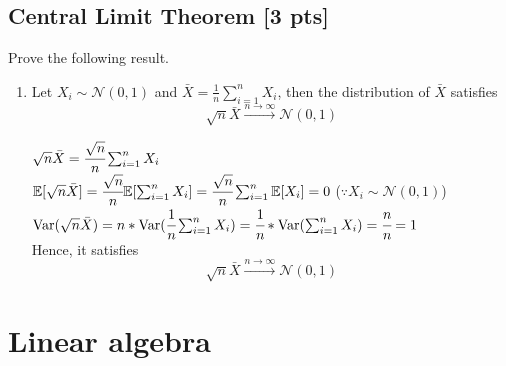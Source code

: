 \documentclass[a4paper]{article}
\theoremstyle{definition}
\newcommand{\Var}{\mathrm{Var}}
\newenvironment{soln}{
	\leavevmode\color{blue}\ignorespaces
}{}
\begin{document}
	\subsection{Central Limit Theorem [3 pts]}
	Prove the following result.
	\begin{enumerate}
		\item Let $X_i\sim\mathcal{N}(0, 1)$ and $\bar{X} = \frac{1}{n}\sum_{i=1}^n X_i$, then the distribution of $\bar{X}$ satisfies 
		$$\sqrt{n}\bar{X}\overset{n\rightarrow\infty}{\longrightarrow}\mathcal{N}(0, 1)$$
		
		\begin{soln} $ \sqrt{n}\bar{X} = \cfrac{\sqrt{n}}{n} \sum_{i=1}^n X_i $ \\ $ \mathbb{E}[\sqrt{n}\bar{X}] = \cfrac{\sqrt{n}}{n} \mathbb{E}[\sum_{i=1}^n X_i] = \cfrac{\sqrt{n}}{n} \sum_{i=1}^n \mathbb{E}[X_i] = 0 $ ($ \because X_i\sim\mathcal{N}(0, 1)$) \\ $ \Var(\sqrt{n}\bar{X}) = n*\Var(\cfrac{1}{n} \sum_{i=1}^n X_i) = \cfrac{1}{n} * \Var(\sum_{i=1}^n X_i) = \cfrac{n}{n} = 1 $ \\ Hence, it satisfies $$\sqrt{n}\bar{X}\overset{n\rightarrow\infty}{\longrightarrow}\mathcal{N}(0, 1)$$ \end{soln}
		
	\end{enumerate}
	
	
	
	\section{Linear algebra}
	
	
\end{document}
